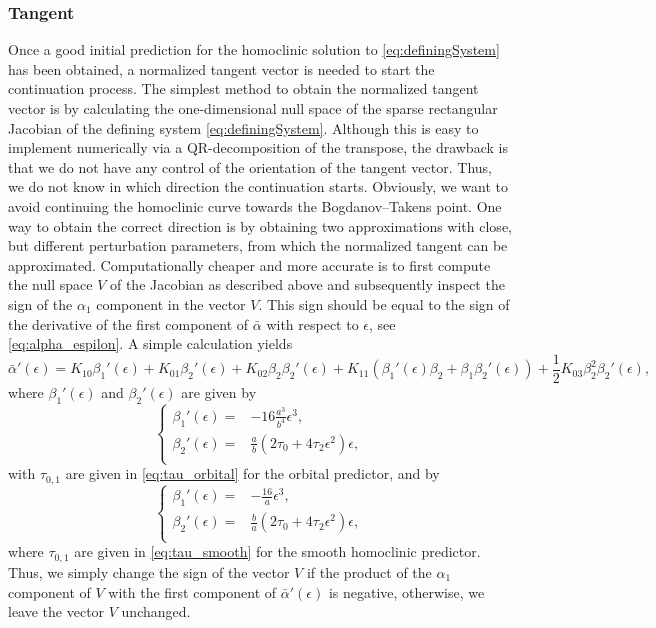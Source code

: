 \subsubsection{Tangent}
Once a good initial prediction for the homoclinic solution to
\cref{eq:definingSystem} has been obtained, a normalized tangent vector is
needed to start the continuation process. The simplest method to obtain the
normalized tangent vector is by calculating the one-dimensional null space of
the sparse rectangular Jacobian of the defining system \cref{eq:definingSystem}.
Although this is easy to implement numerically via a QR-decomposition of the
transpose, the drawback is that we do not have any control of the orientation
of the tangent vector. Thus, we do not know in which direction the continuation
starts.  Obviously, we want to avoid continuing the homoclinic curve towards
the Bogdanov--Takens point. One way to obtain the correct direction is by
obtaining two approximations with close, but different perturbation parameters,
from which the normalized tangent can be approximated.  Computationally cheaper
and more accurate is to first compute the null space $V$ of the Jacobian as
described above and subsequently inspect the sign of the $\alpha_1$ component
in the vector $V$. This sign should be equal to the sign of the derivative of
the first component of $\bar\alpha$ with respect to $\epsilon$, see
\cref{eq:alpha_espilon}. A simple calculation yields
\[
\bar\alpha'(\epsilon)  = K_{10} \beta_1'(\epsilon) + K_{01} \beta_2'(\epsilon) +
     K_{02} \beta_2 \beta_2'(\epsilon) + K_{11} (\beta_1'(\epsilon) \beta_2 +
     \beta_1 \beta_2'(\epsilon)) + \frac{1}{2} K_{03}\beta_2^2 \beta_2'(\epsilon),
\] 
where $\beta_1'(\epsilon)$ and $\beta_2'(\epsilon)$ are given by
\[
\left\{
\begin{aligned}
    \beta_1'(\epsilon) ={}& -16 \frac{a^3}{b^4} \epsilon^3, \\
    \beta_2'(\epsilon) ={}& \frac{a}{b} (2 \tau_0 + 4 \tau_2 \epsilon^2) \epsilon, \\
\end{aligned}
\right.
\] 
with $\tau_{0,1}$ are given in \cref{eq:tau_orbital} for the orbital
predictor, and by
\[
\left\{
\begin{aligned}
    \beta_1'(\epsilon) ={}&  -\frac{16}{a} \epsilon^3, \\
    \beta_2'(\epsilon) ={}& \frac{b}{a} (2 \tau_0 + 4 \tau_2 \epsilon^2) \epsilon, \\
\end{aligned}
\right.
\] 
where $\tau_{0,1}$ are given in \cref{eq:tau_smooth} for the smooth homoclinic
predictor. Thus, we simply change the sign of the vector $V$ if the product of
the $\alpha_1$ component of $V$ with the first component of $\bar\alpha'(\epsilon)$
is negative, otherwise, we leave the vector $V$ unchanged.
\fi

